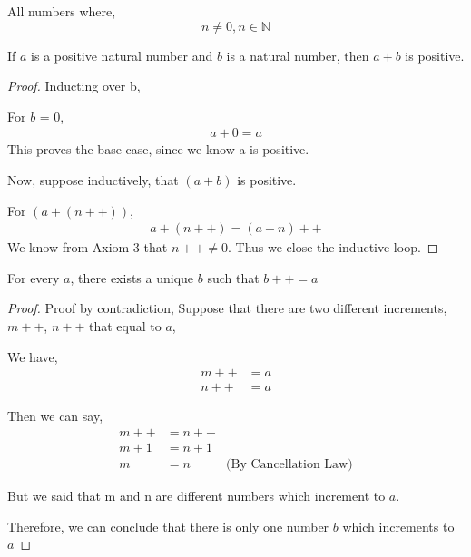 \documentclass[11pt]{report}
\begin{document}
\begin{definition}
All numbers where,
\[
n \neq 0, n \in \mathbb{N}
\]
\end{definition}
\begin{prop}
If $a$ is a positive natural number and $b$ is a natural number, then $a+b$ is positive.
\end{prop}
\begin{proof}
Inducting over b,

For $b$ = 0,
\begin{align*}
a+0 = a
\end{align*}
This proves the base case, since we know a is positive.

Now, suppose inductively, that $(a+b)$ is positive.

For $(a+(n++))$,
\begin{align*}
a+(n++) = (a+n)++
\end{align*}
We know from Axiom 3 that $n++ \neq 0$. Thus we close the inductive loop.
\end{proof}
\begin{lemma}
For every $a$, there exists a unique $b$ such that $b++ = a$
\end{lemma}
\begin{proof}
Proof by contradiction,
Suppose that there are two different increments, $m++$, $n++$ that equal to $a$,

We have,
\begin{align*}
m++ &= a \\
n++ &= a
\end{align*}

Then we can say,
\begin{align*}
m++ &= n++ \\
m + 1 &= n+1 \\
m &= n &\text{(By Cancellation Law)}
\end{align*}

But we said that m and n are different numbers which increment to $a$.

Therefore, we can conclude that there is only one number $b$ which increments to $a$
\end{proof}
\end{document}

